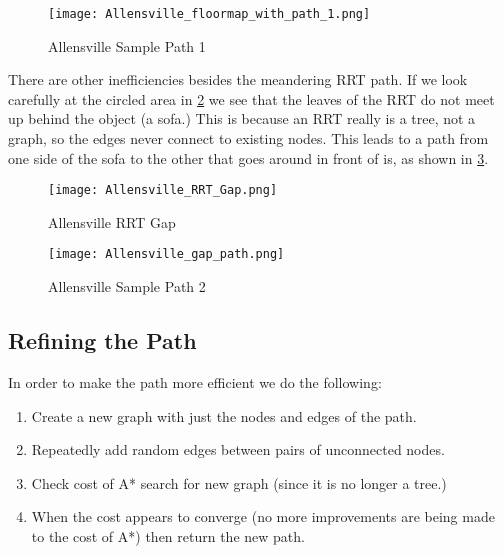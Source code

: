 \documentclass[10pt,twocolumn,letterpaper]{article}
\begin{document}
\begin{centering}
\begin{figure}[ht]
\caption{Allensville Sample Path 1} \centering
\texttt{[image: Allensville\_floormap\_with\_path\_1.png]}
\label{fig:path_1}
\end{figure}
\end{centering}

There are other inefficiencies besides the meandering RRT path. If we
look carefully at the circled area in \ref{fig:gap} we see that the
leaves of the RRT do not meet up behind the object (a sofa.) This is
because an RRT really is a tree, not a graph, so the edges never
connect to existing nodes. This leads to a path from one side of the
sofa to the other that goes around in front of is, as shown in
\ref{fig:path_2}.

\begin{centering}
\begin{figure}[ht]
\caption{Allensville RRT Gap} \centering
\texttt{[image: Allensville\_RRT\_Gap.png]}
\label{fig:gap}
\end{figure}
\end{centering}

\begin{centering}
\begin{figure}[ht]
\caption{Allensville Sample Path 2} \centering
\texttt{[image: Allensville\_gap\_path.png]}
\label{fig:path_2}
\end{figure}
\end{centering}

\subsection{Refining the Path}

In order to make the path more efficient we do the following:

\begin{enumerate}
\item Create a new graph with just the nodes and edges of the path.
\item Repeatedly add random edges between pairs of unconnected nodes.
\item Check cost of A* search for new graph (since it is no longer a tree.)
\item When the cost appears to converge (no more improvements are
  being made to the cost of A*) then return the new path.
\end{enumerate}
\end{document}
